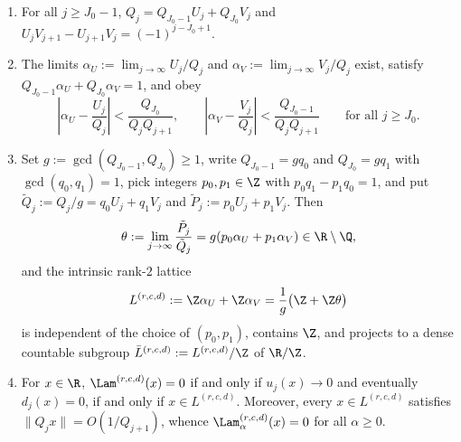 \begin{lemma}\label{lem:poly-lattice}
\begin{enumerate}[label=(\roman*),leftmargin=2em]
\item For all $j\ge J_0-1$, $Q_j=Q_{J_0-1}U_j+Q_{J_0}V_j$ and
$U_jV_{j+1}-U_{j+1}V_j=(-1)^{j-J_0+1}$.
\item The limits $\alpha_U:=\lim_{j\to\infty}U_j/Q_j$ and
$\alpha_V:=\lim_{j\to\infty}V_j/Q_j$ exist, satisfy
$Q_{J_0-1}\alpha_U+Q_{J_0}\alpha_V=1$, and obey
\[
\left|\alpha_U-\frac{U_j}{Q_j}\right|<\frac{Q_{J_0}}{Q_jQ_{j+1}},\qquad
\left|\alpha_V-\frac{V_j}{Q_j}\right|<\frac{Q_{J_0-1}}{Q_jQ_{j+1}}
\qquad\text{for all }j\ge J_0.
\]
\item Set $g:=\gcd(Q_{J_0-1},Q_{J_0})\ge1$, write $Q_{J_0-1}=gq_0$ and
$Q_{J_0}=gq_1$ with $\gcd(q_0,q_1)=1$, pick integers $p_0,p_1\in\Z$ with
$p_0q_1-p_1q_0=1$, and put $\tilde Q_j:=Q_j/g=q_0U_j+q_1V_j$ and
$\tilde P_j:=p_0U_j+p_1V_j$. Then
\[
\theta:=\lim_{j\to\infty}\frac{\tilde P_j}{\tilde Q_j}=g(p_0\alpha_U+p_1\alpha_V)\in\R\setminus\Q,
\]
and the intrinsic rank-$2$ lattice
\[
L^{(r,c,d)}:=\Z\alpha_U+\Z\alpha_V=\frac{1}{g}\bigl(\Z+\Z\theta\bigr)
\]
is independent of the choice of $(p_0,p_1)$, contains $\Z$, and projects to a
dense countable subgroup $\bar L^{(r,c,d)}:=L^{(r,c,d)}/\Z$ of $\R/\Z$.
\item For $x\in\R$, $\Lam^{(r,c,d)}(x)=0$ if and only if $u_j(x)\to0$ and
eventually $d_j(x)=0$, if and only if $x\in L^{(r,c,d)}$. Moreover, every
$x\in L^{(r,c,d)}$ satisfies $\|Q_jx\|=O(1/Q_{j+1})$, whence
$\Lam_\alpha^{(r,c,d)}(x)=0$ for all $\alpha\ge0$.
\end{enumerate}
\end{lemma}

